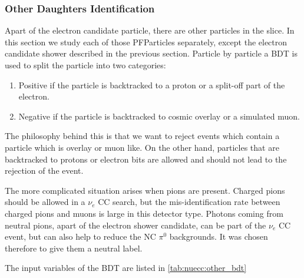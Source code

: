 

\subsubsection{Other Daughters Identification}

Apart of the electron candidate particle, there are other particles in the slice. In this section we study each of those PFParticles separately, except the electron candidate shower described in the previous section. Particle by particle a BDT is used to split the particle into two categories:
\begin{enumerate}
    \item Positive if the particle is backtracked to a proton or a split-off part of the electron.
    \item Negative if the particle is backtracked to cosmic overlay or a simulated muon. 
\end{enumerate}
The philosophy behind this is that we want to reject events which contain a particle which is overlay or muon like. On the other hand, particles that are backtracked to protons or electron bits are allowed and should not lead to the rejection of the event.
\par The more complicated situation arises when pions are present. Charged pions should be allowed in a $\nu_e$ CC search, but the mis-identification rate between charged pions and muons is large in this detector type. Photons coming from neutral pions, apart of the electron shower candidate, can be part of the $\nu_e$ CC event, but can also help to reduce the NC $\pi^0$ backgrounds. It was chosen therefore to give them a neutral label. 

The input variables of the BDT are listed in \cref{tab:nuecc:other_bdt}



